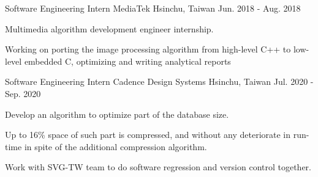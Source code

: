 

\begin{cventries}

\cventry
    {Software Engineering Intern} %
    {MediaTek} %
    {Hsinchu, Taiwan} %
    {Jun. 2018 - Aug. 2018} %
    {
      \begin{cvitems} %
        \item {Multimedia algorithm development engineer internship.}
        \item {Working on porting the image processing algorithm from high-level C++ to low-level embedded C, optimizing and writing analytical reports}
      \end{cvitems}
    }

\cventry
    {Software Engineering Intern} %
    {Cadence Design Systems} %
    {Hsinchu, Taiwan} %
    {Jul. 2020 - Sep. 2020} %
    {
        \begin{cvitems} %
        \item {Develop an algorithm to optimize part of the database size.}
        \item {Up to 16\% space of such part is compressed, and without any deteriorate in run-time in spite of the additional compression algorithm.}
        \item {Work with SVG-TW team to do software regression and version control together.}
        \end{cvitems}
    } 
\end{cventries}
